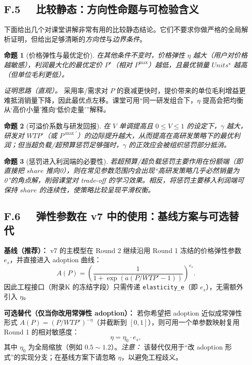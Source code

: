 \documentclass[UTF8,12pt]{ctexart}
\newtheorem{proposition}{命题}
\begin{document}
\subsection*{F.5 \ \ 比较静态：方向性命题与可检验含义}
下面给出几个对课堂讲解非常有用的比较静态结论。它们不要求你做严格的全局解析证明，但给出足够清晰的\emph{方向性}与\emph{边界条件}。

\begin{proposition}[价格弹性与最优定价]\label{prop:eta}
在其他条件不变时，价格弹性 $\eta$ 越大（用户对价格越敏感），利润最大化的最优定价 $P^\star$（相对 $P^{\max}$）越低，且最优销量 $Units^\star$ 越高（但单位毛利更低）。
\end{proposition}
\noindent\textit{证明思路（直观）。} 采用率/需求对 $P$ 的衰减更快时，提价带来的单位毛利增益更难抵消销量下降，因此最优点左移。课堂可用“同一研发组合下，$\eta$ 提高会把均衡从‘高价小量’推向‘低价走量’”解释。

\begin{proposition}[可溢价系数与研发回报]\label{prop:gamma}
在 $V$ 单调提高且 $0\le V\le 1$ 的设定下，$\gamma$ 越大，研发对 $WTP'$（或 $P^{\max\prime}$）的边际提升越大，从而提高在高研发策略下的最优利润；但当超负载/超预算惩罚足够强时，$\gamma$ 的正效应会被组织惩罚部分抵消。
\end{proposition}

\begin{proposition}[惩罚进入利润端的必要性]\label{prop:penalty}
若超预算/超负载惩罚主要作用在\emph{份额}端（即直接把 $share$ 推向0），则在常见参数范围内会出现“高研发策略几乎必然销量为0”的角点解，削弱课堂对 trade-off 的学习效果。相反，将惩罚主要移入利润端可保持 $share$ 的连续性，使策略比较呈现平滑权衡。
\end{proposition}

\subsection*{F.6 \ \ 弹性参数在 v7 中的使用：基线方案与可选替代}
\textbf{基线（推荐）：} v7 的主模型在 Round 2 继续沿用 Round 1 冻结的价格弹性参数 $e_s$，并直接进入 adoption 曲线：
\[
A(P)=\left(\frac{1}{1+\exp(a(P/WTP'-1))}\right)^{e_s}.
\]
因此工程接口（附录K 的冻结字段）只需传递 \texttt{elasticity\_e}（即 $e_s$），无需额外引入 $\eta$。

\textbf{可选替代（仅当你改用常弹性 adoption）：} 若你希望把 adoption 近似成常弹性形式 $A(P)=(P/WTP')^{-\eta}$（并截断到 $[0,1]$），则可用一个单参数映射复用 Round 1 的相对敏感度：
\[
\eta=\eta_0\cdot e_s,
\]
其中 $\eta_0$ 为全局缩放（例如 $0.5\sim 1.2$）。\emph{注意：} 该替代仅用于“改 adoption 形式”的实现分支；在基线方案下请忽略 $\eta$，以避免工程歧义。
\end{document}
